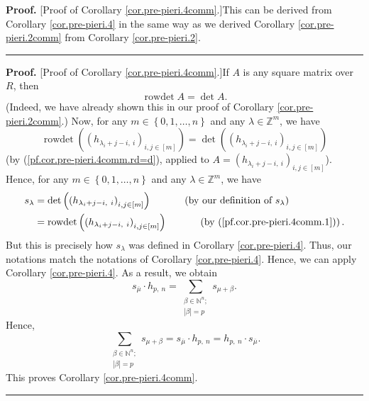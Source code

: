 \documentclass[numbers=enddot,12pt,final,onecolumn,notitlepage,english]{scrartcl}%
\theoremstyle{definition}
\newenvironment{proof}[1][Proof]{\noindent\textbf{#1.} }{\ \rule{0.5em}{0.5em}}
\let\sumnonlimits\sum
\renewcommand{\sum}{\sumnonlimits\limits}
\newenvironment{verlong}{}{}
\newenvironment{vershort}{}{}
\begin{document}
\begin{vershort}
\begin{proof}
[Proof of Corollary \ref{cor.pre-pieri.4comm}.]This can be derived from
Corollary \ref{cor.pre-pieri.4} in the same way as we derived Corollary
\ref{cor.pre-pieri.2comm} from Corollary \ref{cor.pre-pieri.2}.
\end{proof}
\end{vershort}

\begin{verlong}
\begin{proof}
[Proof of Corollary \ref{cor.pre-pieri.4comm}.]If $A$ is any square matrix
over $R$, then%
\begin{equation}
\operatorname*{rowdet}A=\det A. \label{pf.cor.pre-pieri.4comm.rd=d}%
\end{equation}
(Indeed, we have already shown this in our proof of Corollary
\ref{cor.pre-pieri.2comm}.) Now, for any $m\in\left\{  0,1,\ldots,n\right\}  $
and any $\lambda\in\mathbb{Z}^{m}$, we have%
\begin{equation}
\operatorname*{rowdet}\left(  \left(  h_{\lambda_{i}+j-i,\ i}\right)
_{i,j\in\left[  m\right]  }\right)  =\det\left(  \left(  h_{\lambda
_{i}+j-i,\ i}\right)  _{i,j\in\left[  m\right]  }\right)
\label{pf.cor.pre-pieri.4comm.1}%
\end{equation}
(by (\ref{pf.cor.pre-pieri.4comm.rd=d}), applied to $A=\left(  h_{\lambda
_{i}+j-i,\ i}\right)  _{i,j\in\left[  m\right]  }$). Hence, for any
$m\in\left\{  0,1,\ldots,n\right\}  $ and any $\lambda\in\mathbb{Z}^{m}$, we
have%
\begin{align*}
s_{\lambda}  &  =\det\left(  \left(  h_{\lambda_{i}+j-i,\ i}\right)
_{i,j\in\left[  m\right]  }\right)  \ \ \ \ \ \ \ \ \ \ \left(  \text{by our
definition of }s_{\lambda}\right) \\
&  =\operatorname*{rowdet}\left(  \left(  h_{\lambda_{i}+j-i,\ i}\right)
_{i,j\in\left[  m\right]  }\right)  \ \ \ \ \ \ \ \ \ \ \left(  \text{by
(\ref{pf.cor.pre-pieri.4comm.1})}\right)  .
\end{align*}
But this is precisely how $s_{\lambda}$ was defined in Corollary
\ref{cor.pre-pieri.4}. Thus, our notations match the notations of Corollary
\ref{cor.pre-pieri.4}. Hence, we can apply Corollary \ref{cor.pre-pieri.4}. As
a result, we obtain%
\[
s_{\overline{\mu}}\cdot h_{p,\ n}=\sum_{\substack{\beta\in\mathbb{N}%
^{n};\\\left\vert \beta\right\vert =p}}s_{\mu+\beta}.
\]
Hence,%
\[
\sum_{\substack{\beta\in\mathbb{N}^{n};\\\left\vert \beta\right\vert
=p}}s_{\mu+\beta}=s_{\overline{\mu}}\cdot h_{p,\ n}=h_{p,\ n}\cdot
s_{\overline{\mu}}.
\]
This proves Corollary \ref{cor.pre-pieri.4comm}.
\end{proof}
\end{verlong}
\end{document}
